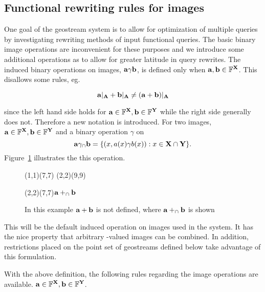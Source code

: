 \documentclass{vldb}
\begin{document}
\subsection{Functional rewriting rules for images}

One goal of the geostream system is to allow for optimization of
multiple queries by investigating rewriting methods of input
functional queries.  The basic binary image operations are
inconvenient for these purposes and we introduce some additional
operations as to allow for greater latitude in query rewrites.  The
induced binary operations on images, ${\bf{a}} \gamma {\ensuremath{\bf{b}}}$, is
defined only when ${\bf{a}},{\bf{b}} \in {\ensuremath{\mathbb{F}}}^{{\bf{X}}}$.  This disallows
some rules, eg.

\[{\bf{a}}|_{\bf{A}} + {\bf{b}}|_{\bf{A}} \ne ({\bf{a}}+{\bf{b}})|_{\bf{A}}\]

since the left hand side holds for ${\bf{a}} \in {\ensuremath{\mathbb{F}}}^{{\bf{X}}}, {\bf{b}}
\in {\ensuremath{\mathbb{F}}}^{{\bf{Y}}}$ while the right side generally does not.  Therefore
a new notation is introduced.  For two images, ${\bf{a}} \in
{\ensuremath{\mathbb{F}}}^{{\bf{X}}}, {\bf{b}} \in {\ensuremath{\mathbb{F}}}^{{\bf{Y}}}$ and a binary operation
$\gamma$ on  \[ {\bf{a}} \gamma_\cap {\ensuremath{\bf{b}}} = \{ (x,a(x) \gamma
b(x)) : x \in {\ensuremath{\bf{X}}} \cap {\ensuremath{\bf{Y}}} \}. \] Figure~\ref{fig:cap}
illustrates the this operation.

\begin{figure}[htbp]
  \centering
    \begin{FramePic}[10,10]
   \roi[style=frame](1,1)(7,7){}
   \roi[style=frame](2,2)(9,9){}
 \end{FramePic}
\quad
  \begin{FramePic}[10,10]
   \roi[style=overlap](2,2)(7,7){${\bf{a}} +_\cap {\ensuremath{\bf{b}}}$}
 \end{FramePic}
\label{fig:cap}
\caption{%
%
  In this example ${\bf{a}}+{\bf{b}}$ is not defined, where ${\bf{a}} +_\cap
  {\ensuremath{\bf{b}}}$ is shown}
\end{figure}

This will be the default induced operation on images used in the
system.  It has the nice property that arbitrary -valued images
can be combined.  In addition, restrictions placed on the point set of
geostreams defined below take advantage of this formulation.

With the above definition, the following rules regarding the image
operations are available.  ${\bf{a}} \in {\ensuremath{\mathbb{F}}}^{{\bf{X}}}, {\bf{b}} \in
{\ensuremath{\mathbb{F}}}^{{\bf{Y}}}$.
\end{document}
